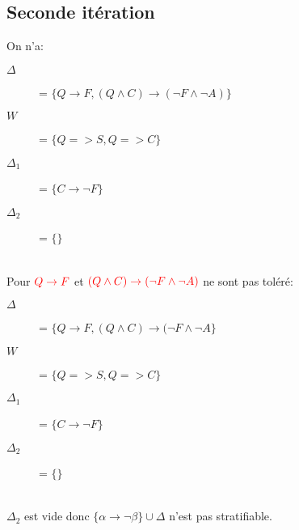 \subsection{Seconde itération}
On n'a:
\begin{description}
\item[$\Delta$] = $\{ Q \rightarrow F, (Q \wedge C) \rightarrow (\neg F \wedge \neg A) \}$
\item[$W$] = $\{ Q => S, Q => C\}$
\item[$\Delta_1$] = $\{ C \rightarrow \neg F \}$
\item[$\Delta_2$] = $\{ \}$
\end{description}
\ \\
Pour $\textcolor{red}{ Q \rightarrow F }$ et $\textcolor{red}{ ( Q \wedge C) \rightarrow (\neg F \wedge \neg A) }$ ne sont pas toléré:
\begin{description}
\item[$\Delta$] = $\{ Q \rightarrow F, (Q \wedge C) \rightarrow (\neg F \wedge \neg A \}$
\item[$W$] = $\{ Q => S, Q => C\}$
\item[$\Delta_1$] = $\{ C \rightarrow \neg F \}$
\item[$\Delta_2$] = $\{ \}$
\end{description}
\ \\
$\Delta_2$ est vide donc $\{\alpha \rightarrow \neg \beta \} \cup \Delta$ n'est pas stratifiable.
\pagebreak
